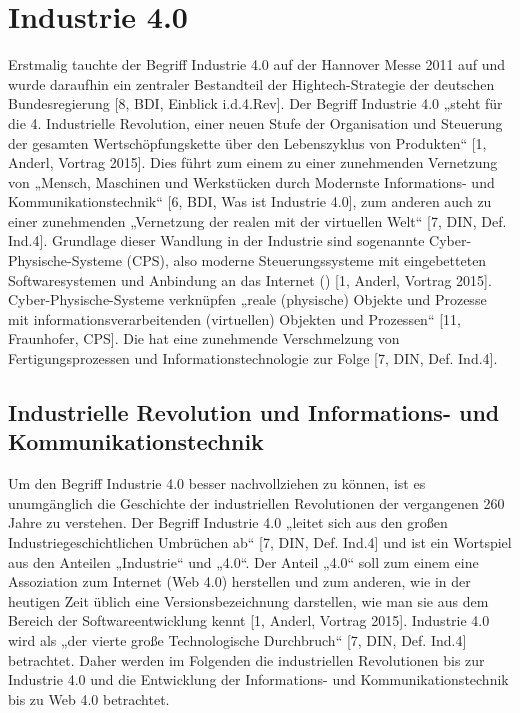 \section{Industrie 4.0}\label{sec:Industrie4.0}
Erstmalig tauchte der Begriff Industrie 4.0 auf der Hannover Messe 2011 auf und wurde daraufhin ein zentraler Bestandteil der Hightech-Strategie der deutschen Bundesregierung [8, BDI, Einblick i.d.4.Rev].
\newline
Der Begriff Industrie 4.0 „steht für die 4. Industrielle Revolution, einer neuen Stufe der Organisation und Steuerung der gesamten Wertschöpfungskette über den Lebenszyklus von Produkten“ [1, Anderl, Vortrag 2015]. Dies führt zum einem zu einer zunehmenden Vernetzung von „Mensch, Maschinen und Werkstücken durch Modernste Informations- und Kommunikationstechnik“ [6, BDI, Was ist Industrie 4.0], zum anderen auch zu einer zunehmenden „Vernetzung der realen mit der virtuellen Welt“ [7, DIN, Def. Ind.4]. Grundlage dieser Wandlung in der Industrie sind sogenannte Cyber-Physische-Systeme (CPS), also moderne Steuerungssysteme mit eingebetteten Softwaresystemen und Anbindung an das Internet (\cite{1}) [1, Anderl, Vortrag 2015]. Cyber-Physische-Systeme verknüpfen „reale (physische) Objekte und Prozesse mit informationsverarbeitenden (virtuellen) Objekten und Prozessen“ [11, Fraunhofer, CPS]. Die hat eine zunehmende Verschmelzung von Fertigungsprozessen und Informationstechnologie zur Folge [7, DIN, Def. Ind.4].

\subsection{Industrielle Revolution und Informations- und Kommunikationstechnik}\label{sec:GeschichteIndustrie4}
Um den Begriff Industrie 4.0 besser nachvollziehen zu können, ist es unumgänglich die Geschichte der industriellen Revolutionen der vergangenen 260 Jahre zu verstehen. Der Begriff Industrie 4.0 „leitet sich aus den großen Industriegeschichtlichen Umbrüchen ab“ [7, DIN, Def. Ind.4] und ist ein Wortspiel aus den Anteilen „Industrie“ und „4.0“. Der Anteil „4.0“ soll zum einem eine Assoziation zum Internet (Web 4.0) herstellen und zum anderen, wie in der heutigen Zeit üblich eine Versionsbezeichnung darstellen, wie man sie aus dem Bereich der Softwareentwicklung kennt [1, Anderl, Vortrag 2015].
\newline
Industrie 4.0 wird als „der vierte große Technologische Durchbruch“ [7, DIN, Def. Ind.4] betrachtet. Daher werden im Folgenden die industriellen Revolutionen bis zur Industrie 4.0 und die Entwicklung der Informations- und Kommunikationstechnik bis zu Web 4.0 betrachtet.

